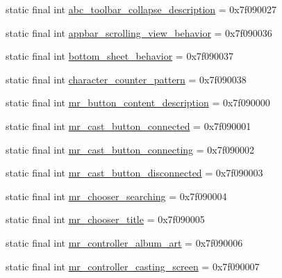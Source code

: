 \begin{CompactItemize}
\item 
static final int \hyperlink{classandroid_1_1support_1_1graphics_1_1drawable_1_1_r_1_1string_374c7224ebdc6d178ddd227b379ddcd0}{abc\_\-toolbar\_\-collapse\_\-description} = 0x7f090027
\item 
static final int \hyperlink{classandroid_1_1support_1_1graphics_1_1drawable_1_1_r_1_1string_9cf7e2d2ed406b7ad5d34edf1d8c9cd4}{appbar\_\-scrolling\_\-view\_\-behavior} = 0x7f090036
\item 
static final int \hyperlink{classandroid_1_1support_1_1graphics_1_1drawable_1_1_r_1_1string_6eee05c38e4933fee297959bff7c988a}{bottom\_\-sheet\_\-behavior} = 0x7f090037
\item 
static final int \hyperlink{classandroid_1_1support_1_1graphics_1_1drawable_1_1_r_1_1string_64d1ce0d126e7a73da360e17be92c831}{character\_\-counter\_\-pattern} = 0x7f090038
\item 
static final int \hyperlink{classandroid_1_1support_1_1graphics_1_1drawable_1_1_r_1_1string_4321a108a09a443b0966641d14e02cef}{mr\_\-button\_\-content\_\-description} = 0x7f090000
\item 
static final int \hyperlink{classandroid_1_1support_1_1graphics_1_1drawable_1_1_r_1_1string_cc25509c29cb142c8a78a3ac0a32b870}{mr\_\-cast\_\-button\_\-connected} = 0x7f090001
\item 
static final int \hyperlink{classandroid_1_1support_1_1graphics_1_1drawable_1_1_r_1_1string_249a70eb170801296dcffe9406828f37}{mr\_\-cast\_\-button\_\-connecting} = 0x7f090002
\item 
static final int \hyperlink{classandroid_1_1support_1_1graphics_1_1drawable_1_1_r_1_1string_29b23c17e9661f3ac3d84e0d5c0cb5b8}{mr\_\-cast\_\-button\_\-disconnected} = 0x7f090003
\item 
static final int \hyperlink{classandroid_1_1support_1_1graphics_1_1drawable_1_1_r_1_1string_93645ed8b414d17ca0ad1743f543ca74}{mr\_\-chooser\_\-searching} = 0x7f090004
\item 
static final int \hyperlink{classandroid_1_1support_1_1graphics_1_1drawable_1_1_r_1_1string_130eb80da44b2f09c0800da7dce71ac4}{mr\_\-chooser\_\-title} = 0x7f090005
\item 
static final int \hyperlink{classandroid_1_1support_1_1graphics_1_1drawable_1_1_r_1_1string_7803b4480873fadd1e8ec6046630d8fa}{mr\_\-controller\_\-album\_\-art} = 0x7f090006
\item 
static final int \hyperlink{classandroid_1_1support_1_1graphics_1_1drawable_1_1_r_1_1string_dc9591c94c2198156156209ae421305e}{mr\_\-controller\_\-casting\_\-screen} = 0x7f090007

\end{CompactItemize}
